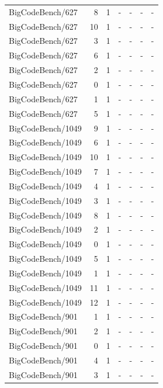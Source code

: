 \begin{longtable}{lrrllll}
BigCodeBench/627 & 8 & 1 & - & - & - & - \\
BigCodeBench/627 & 10 & 1 & - & - & - & - \\
BigCodeBench/627 & 3 & 1 & - & - & - & - \\
BigCodeBench/627 & 6 & 1 & - & - & - & - \\
BigCodeBench/627 & 2 & 1 & - & - & - & - \\
BigCodeBench/627 & 0 & 1 & - & - & - & - \\
BigCodeBench/627 & 1 & 1 & - & - & - & - \\
BigCodeBench/627 & 5 & 1 & - & - & - & - \\
BigCodeBench/1049 & 9 & 1 & - & - & - & - \\
BigCodeBench/1049 & 6 & 1 & - & - & - & - \\
BigCodeBench/1049 & 10 & 1 & - & - & - & - \\
BigCodeBench/1049 & 7 & 1 & - & - & - & - \\
BigCodeBench/1049 & 4 & 1 & - & - & - & - \\
BigCodeBench/1049 & 3 & 1 & - & - & - & - \\
BigCodeBench/1049 & 8 & 1 & - & - & - & - \\
BigCodeBench/1049 & 2 & 1 & - & - & - & - \\
BigCodeBench/1049 & 0 & 1 & - & - & - & - \\
BigCodeBench/1049 & 5 & 1 & - & - & - & - \\
BigCodeBench/1049 & 1 & 1 & - & - & - & - \\
BigCodeBench/1049 & 11 & 1 & - & - & - & - \\
BigCodeBench/1049 & 12 & 1 & - & - & - & - \\
BigCodeBench/901 & 1 & 1 & - & - & - & - \\
BigCodeBench/901 & 2 & 1 & - & - & - & - \\
BigCodeBench/901 & 0 & 1 & - & - & - & - \\
BigCodeBench/901 & 4 & 1 & - & - & - & - \\
BigCodeBench/901 & 3 & 1 & - & - & - & - \\
\end{longtable}
